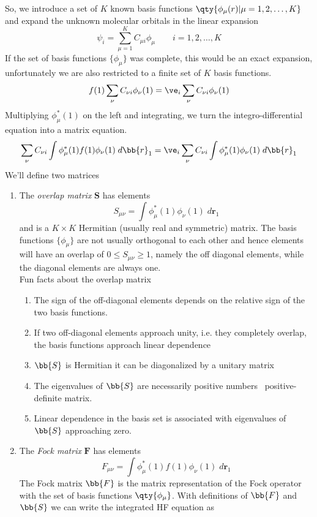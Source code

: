 \documentclass[11pt]{article}
\begin{document}
So, we introduce a set of $K$ known basis functions $\qty{\phi_\mu (r) | \mu = 1, 2, \dotsc, K }$ and expand the unknown molecular orbitals in the linear expansion
\begin{equation}\label{eq:lcao}
\psi_i = \sum_{\mu=1}^K C_{\mu i} \phi_\mu \qquad i = 1, 2, \dotsc, K
\end{equation}
If the set of basis functions $\{\phi_\mu\}$ was complete, this would be an exact expansion, unfortunately we are also restricted to a finite set of $K$ basis functions. 
\begin{equation}\label{key}
f(1) \sum_\nu C_{\nu i} \phi_\nu (1) = \ve_i \sum_\nu C_{\nu i} \phi_\nu (1)
\end{equation}
Multiplying $\phi_\mu^*(1)$ on the left and integrating, we turn the integro-differential equation into a matrix equation. 
\begin{equation}\label{key}
\sum_\nu C_{\nu i} \int \phi_\mu^* (1) f(1) \phi_\nu(1)\;d\bb{r}_1  = \ve_i \sum_\nu C_{\nu i} \int \phi_\mu^* (1) \phi_\nu (1) \;d\bb{r}_1 
\end{equation}
We'll define two matrices
\begin{enumerate}
  \item The \textit{overlap matrix} $\mathbf{S}$ has elements
  \begin{equation}\label{key}
  S_{\mu \nu} = \int \phi_\mu^*(1) \phi_\nu (1) \; d\mathbf{r}_1
  \end{equation} 
  and is a $K\times K$ Hermitian (usually real and symmetric) matrix. The basis functions $\{\phi_\mu\}$ are not usually orthogonal to each other and hence elements will have an overlap of $0 \leq S_{\mu\nu} \geq 1$, namely the off diagonal elements, while the diagonal elements are always one.\\
  Fun facts about the overlap matrix 
  \begin{enumerate}
    \item The sign of the off-diagonal elements depends on the relative sign of the two basis functions. 
    \item If two off-diagonal elements approach unity, i.e. they completely overlap, the basis functions approach linear dependence
    \item $\bb{S}$ is Hermitian it can be diagonalized by a unitary matrix 
    \item The eigenvalues of  $\bb{S}$ are necessarily positive numbers \rw\ positive-definite matrix. 
    \item Linear dependence in the basis set is associated with eigenvalues of $\bb{S}$ approaching zero. 
  \end{enumerate}
  \item The \textit{Fock matrix} $\mathbf{F}$ has elements
  \begin{equation}\label{key}
  F_{\mu \nu } = \int \phi_\mu^* (1) f(1) \phi_\nu (1) \; d\mathbf{r}_1 
  \end{equation}
  The Fock matrix $\bb{F}$ is the matrix representation of the Fock operator with the set of basis functions $\qty{\phi_\mu}$. With definitions of $\bb{F}$ and $\bb{S}$ we can write the integrated HF equation as
\end{enumerate}
\end{document}
